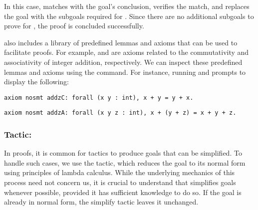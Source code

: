In this case, \EasyCrypt matches  with the goal’s conclusion, verifies the match, and replaces the goal with the subgoals required for . Since there are no additional subgoals to prove for , the proof is concluded successfully.

\EasyCrypt also includes a library of predefined lemmas and axioms that can be used to facilitate proofs. For example,  and  are axioms related to the commutativity and associativity of integer addition, respectively. We can inspect these predefined lemmas and axioms using the  command. For instance, running  and  prompts \EasyCrypt to display the following:\\
\begin{lstlisting}[style=easycrypt]
axiom nosmt addzC: forall (x y : int), x + y = y + x.
\end{lstlisting}
\begin{lstlisting}[style=easycrypt]
axiom nosmt addzA: forall (x y z : int), x + (y + z) = x + y + z.
\end{lstlisting}

\newpage
\subsubsection{Tactic: }
In proofs, it is common for tactics to produce goals that can be simplified. To handle such cases, we use the  tactic, which reduces the goal to its normal form using principles of lambda calculus. While the underlying mechanics of this process need not concern us, it is crucial to understand that \EasyCrypt simplifies goals whenever possible, provided it has sufficient knowledge to do so. If the goal is already in normal form, the simplify tactic leaves it unchanged.

